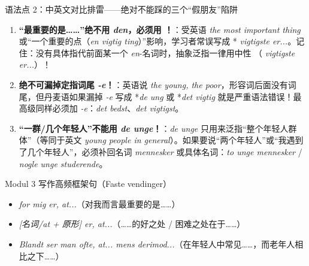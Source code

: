 \begin{grammatikbox}{语法点 2：中英文对比排雷——绝对不能踩的三个“假朋友”陷阱}
\begin{enumerate}
  \item \textbf{“最重要的是……”绝不用 \textit{den}，必须用 ！}：受英语 \textit{the most important thing} 或“一个重要的点（\textit{en vigtig ting}）”影响，学习者常误写成 *\textit{ vigtigste er...}。记住：没有具体指代前面某一个 \textit{en}-名词时，抽象泛指一律用中性 （\textit{ vigtigste er...}）！
  \item \textbf{绝不可漏掉定指词尾 \textit{-e}！}：英语说 \textit{the young, the poor}，形容词后面没有词尾，但丹麦语如果漏掉 \textit{-e} 写成 *\textit{de ung} 或 *\textit{det vigtig} 就是严重语法错误！最高级同样必须加 \textit{-e}：\textit{det bedst}、\textit{det vigtigst}。
  \item \textbf{“一群/几个年轻人”不能用 \textit{de unge}！}：\textit{de unge} 只用来泛指“整个年轻人群体”（等同于英文 \textit{young people in general}）。如果要说“两个年轻人”或“我遇到了几个年轻人”，必须补回名词 \textit{mennesker} 或具体名词：\textit{to unge mennesker} / \textit{nogle unge studerende}。
\end{enumerate}
\end{grammatikbox}

\begin{tipbox}{Modul 3 写作高频框架句（Faste vendinger）}
\begin{itemize}
  \item \textit{ for mig er, at...}（对我而言最重要的是……）
  \item \textit{ [名词/at + 原形] er, at...}（……的好之处 / 困难之处在于……）
  \item \textit{Blandt  ser man ofte, at... mens  derimod...}（在年轻人中常见……，而老年人相比之下……）
\end{itemize}
\end{tipbox}


